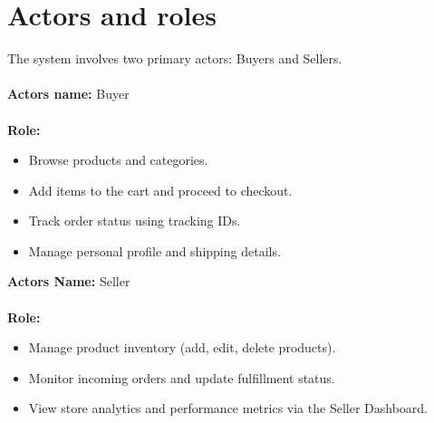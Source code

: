  \section{Actors and roles}
 The system involves two primary actors: Buyers and Sellers.\\\\
\noindent
\textbf{Actors name:} Buyer
\\\\
 \textbf{Role:}
 \begin{itemize}
    \item Browse products and categories.
    \item Add items to the cart and proceed to checkout.
    \item Track order status using tracking IDs.
    \item Manage personal profile and shipping details.
\end{itemize}
\noindent
\textbf{Actors Name:} Seller
\\\\
\textbf{Role:}
\begin{itemize}
    \item Manage product inventory (add, edit, delete products).
    \item Monitor incoming orders and update fulfillment status.
    \item View store analytics and performance metrics via the Seller Dashboard.
\end{itemize}
